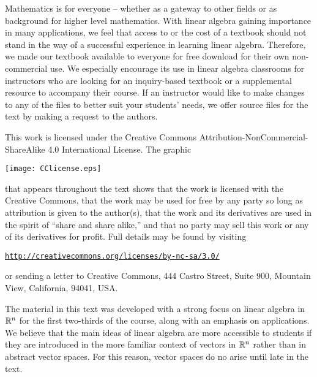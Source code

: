 
 
Mathematics is for everyone -- whether as a gateway to other fields or as background for higher level mathematics. With linear algebra gaining importance in many applications, we feel that access to or the cost of a textbook should not stand in the way of a successful experience in learning linear algebra. Therefore, we made our textbook available to everyone for free download for their own non-commercial use. We especially encourage its use in linear algebra classrooms for instructors who are looking for an inquiry-based textbook or a supplemental resource to accompany their course. If an instructor would like to make changes to any of the files to better suit your students' needs, we offer source files for the text by making a request to the authors.

This work is licensed under the Creative Commons Attribution-NonCommercial-ShareAlike 4.0 International License.  The graphic 
\begin{center}
\texttt{[image: CClicense.eps]}
\end{center}
that appears throughout the text shows that the work is licensed with the Creative Commons, that the work may be used for free by any party so long as attribution is given to the author(s), that the work and its derivatives are used in the spirit of ``share and share alike,'' and that no party may sell this work or any of its derivatives for profit.  Full details may be found by visiting
\begin{center}
\href{http://creativecommons.org/licenses/by-nc-sa/3.0/}{\texttt{http://creativecommons.org/licenses/by-nc-sa/3.0/}}
\end{center} 
or sending a letter to Creative Commons, 444 Castro Street, Suite 900, Mountain View, California, 94041, USA. 


The material in this text was developed with a strong focus on linear algebra in $\mathbb{R}^n$ for the first two-thirds of the course, along with an emphasis on applications. We believe that the main ideas of linear algebra are more accessible to students if they are introduced in the more familiar context of vectors in $\mathbb{R}^n$ rather than in abstract vector spaces. For this reason, vector spaces do no arise until late in the text. 



